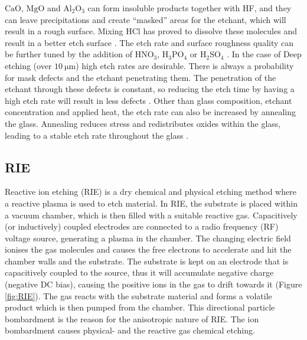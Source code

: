 \documentclass[final]{jyflluk}
\begin{document}
$\mathrm{CaO}$, $\mathrm{MgO}$ and $\mathrm{Al_2 O_3}$ can form insoluble products together with HF, and they can leave precipitations and create “masked” areas for the etchant, which will result in a rough surface. Mixing HCl has proved to dissolve these molecules and result in a better etch surface \cite{iliescu2005characterization}. The etch rate and surface roughness quality can be further tuned by the addition of $\mathrm{HNO_3}$, $\mathrm{H_3 PO_4 }$  or $\mathrm{H_2SO_4}$ \cite{park2017review}. In the case of Deep etching (over $\SI{10}{\micro \metre}$) high etch rates are desirable. There is always a probability for mask defects and the etchant penetrating them. The penetration of the etchant through these defects is constant, so reducing the etch time by having a high etch rate will result in less defects \cite{tay2006defect}. Other than glass composition, etchant concentration and applied heat, the etch rate can also be increased by annealing the glass. Annealing reduces stress and redistributes oxides within the glass, leading to a stable etch rate throughout the glass \cite{iliescu2005THOROUGH}.





\label{sec:xx5}
\subsection{RIE}
Reactive ion etching (RIE) is a dry chemical and physical etching method where a reactive plasma is used to etch material. In RIE, the substrate is placed within a vacuum chamber, which is then filled with a suitable reactive gas. Capacitively (or inductively) coupled electrodes are connected to a radio frequency (RF) voltage source, generating a plasma in the chamber. The changing electric field ionises the gas molecules and causes the free electrons to accelerate and hit the chamber walls and the substrate.  The substrate is kept on an electrode that is capacitively coupled to the source, thus it will accumulate negative charge (negative DC bias), causing the positive ions in the gas to drift towards it (Figure \ref{fig:RIE}). The gas reacts with the substrate material and forms a volatile product which is then pumped from the chamber. This directional particle bombardment is the reason for the anisotropic nature of RIE. The ion bombardment causes physical-  and the reactive gas chemical etching. \cite{Franssila2008}
\end{document}
